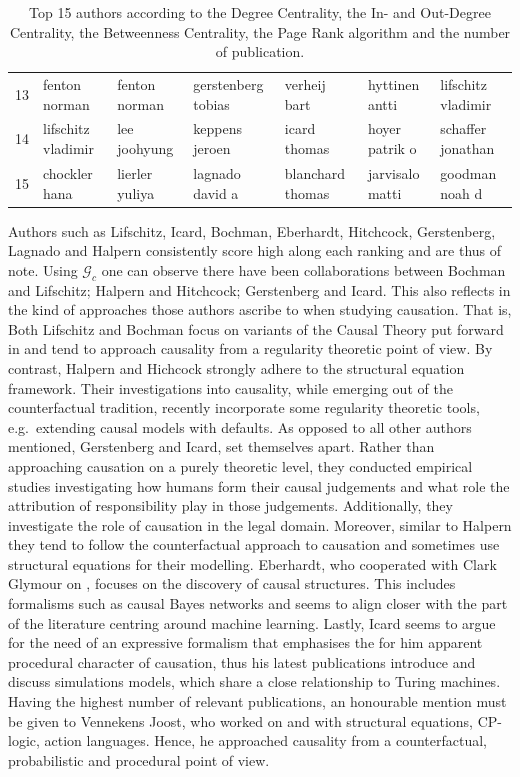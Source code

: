 \documentclass[11pt,a4paper]{book}
\theoremstyle{definition}
\theoremstyle{definition}
\theoremstyle{definition}
\theoremstyle{remark}
\newcommand{\cgraph}{\mathcal{G}_{c}}
\begin{document}
\begin{table}
\begin{tabular}{lllllll}
13 &          fenton norman &          fenton norman &     gerstenberg tobias &           verheij bart &         hyttinen antti &     lifschitz vladimir \\
14 &     lifschitz vladimir &           lee joohyung &         keppens jeroen &           icard thomas &         hoyer patrik o &      schaffer jonathan \\
15 &          chockler hana &         lierler yuliya &        lagnado david a &       blanchard thomas &        jarvisalo matti &         goodman noah d \\
\bottomrule
\end{tabular}
\caption{Top 15 authors according to the Degree Centrality, the In- and Out-Degree Centrality, the Betweenness Centrality, the Page Rank algorithm and the number of publication.}
\label{tab:author_ranking}
\end{table}



Authors such as Lifschitz, Icard, Bochman, Eberhardt, Hitchcock, Gerstenberg, Lagnado and Halpern consistently score high along each ranking and are thus of note.
Using $\cgraph$ one can observe there have been collaborations between Bochman and Lifschitz; Halpern and Hitchcock; Gerstenberg and Icard. 
This also reflects in the kind of approaches those authors ascribe to when studying causation. That is, 
Both Lifschitz and Bochman focus on variants of the Causal Theory put forward in \cite{mccain1997causal} and tend to approach causality from a regularity theoretic point of view. By contrast, Halpern and Hichcock strongly adhere to the structural equation framework. Their investigations into causality, while emerging out of the counterfactual tradition, recently incorporate some regularity theoretic tools, e.g.\ extending causal models with defaults.
As opposed to all other authors mentioned, Gerstenberg and Icard, set themselves apart. Rather than approaching causation on a purely theoretic level, they conducted empirical studies investigating how humans form their causal judgements and what role the attribution of responsibility play in those judgements. Additionally, they investigate the role of causation in the legal domain. Moreover, similar to Halpern they tend to follow the counterfactual approach to causation and sometimes use structural equations for their modelling.
Eberhardt, who cooperated with Clark Glymour on \parencite{glymour2010actual}, focuses on the discovery of causal structures. This includes formalisms such as causal Bayes networks and seems to align closer with the part of the literature centring around machine learning. Lastly, Icard seems to argue for the need of an expressive formalism that emphasises the for him apparent procedural character of causation, thus his latest publications introduce and discuss simulations models, which share a close relationship to Turing machines.
Having the highest number of relevant publications, an honourable mention must be given to Vennekens Joost, who worked on and with structural equations, CP-logic, action languages. Hence, he approached causality from a counterfactual, probabilistic and procedural point of view.
\bigskip
\end{document}
